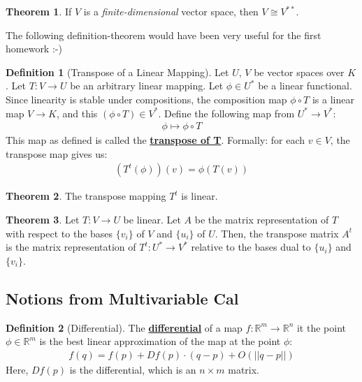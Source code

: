 \documentclass[11pt]{scrartcl}
\newcommand{\R}[0]{\mathbb{R}}
\theoremstyle{definition}
\newtheorem{theorem}{Theorem}
\newtheorem{definition}{Definition}
\theoremstyle{remark}
\newcommand{\dfn}[1]{\textbf{\underline{#1}}}
\begin{document}
{\begin{theorem}
	If $V$ is a \emph{finite-dimensional} vector space, then $V \cong V^{**}$. 
\end{theorem}

The following definition-theorem would have been very useful for the first homework :-) 

\begin{definition}[Transpose of a Linear Mapping] 
	Let $U$, $V$ be vector spaces over $K$. Let $T: V \rightarrow U$ be an arbitrary linear mapping. Let $\phi \in U^*$ be a linear functional. Since linearity is stable under compositions, the composition map $\phi \circ T$ is a linear map $V \rightarrow K$, and this $(\phi \circ T) \in V^*$. Define the following map from $U^* \rightarrow V^*$: 
	\begin{align*}
		\phi \mapsto \phi \circ T 
	\end{align*}
	This map as defined is called the \dfn{transpose of T}. Formally: for each $v \in V$, the transpose map gives us: 
	\begin{align}
		(T^t(\phi))(v) = \phi(T(v)) 	
	\end{align}
\end{definition}


\begin{theorem}
	The transpose mapping $T^t$ is linear. 
\end{theorem}
\begin{theorem}
	Let $T: V \rightarrow U$ be linear. Let $A$ be the matrix representation of $T$ with respect to the bases $\{v_i \}$ of $V$ and $\{ u_i \}$ of $U$. Then, the transpose matrix $A^t$ is the matrix representation of $T^t : U^* \rightarrow V^*$ relative to the bases dual to $\{ u_i \}$ and $\{ v_i \}$. 
\end{theorem}


\subsection{Notions from Multivariable Cal}
\begin{definition}[Differential]
	The \dfn{differential} of a map $f: \R^m \rightarrow \R^n$ it the point $\phi \in \R^m$ is the best linear approximation of the map at the point $\phi$: 
	\begin{align}
		f(q) = f(p) + Df(p) \cdot (q-p) + O(||q-p||) 	
	\end{align}
	Here, $Df(p)$ is the differential, which is an $n \times m$ matrix. 
\end{definition}

}
\end{document}
